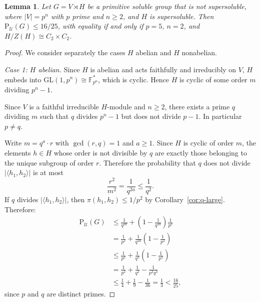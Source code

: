\documentclass{amsart}
\newtheorem{lemma}{Lemma}
\newcommand{\Psu}{\mathrm{P}_{\mathcal{U}}}
\begin{document}
	\begin{lemma}\label{lem:primitive}
		Let $G = V \rtimes H$ be a primitive soluble group that is 
		not supersoluble, where $|V| = p^n$ with $p$ prime and 
		$n \geq 2$, and $H$ is supersoluble. Then 
		$\Psu(G) \leq 16/25$, with equality if and only if $p = 5$, 
		$n=2$, and $H/Z(H) \cong C_2 \times C_2$.
	\end{lemma}
	\begin{proof}
		We consider separately the cases $H$ abelian and $H$ nonabelian.
		
		\medskip
		
		\noindent\textit{Case 1: $H$ abelian.}
		Since $H$ is abelian and acts faithfully and irreducibly on $V$, 
		$H$ embeds into $\mathrm{GL}(1,p^n) \cong \mathbb{F}_{p^n}^*$, 
		which is cyclic. Hence $H$ is cyclic of some order $m$ dividing 
		$p^n - 1$.
		
		Since $V$ is a faithful irreducible $H$-module and $n \geq 2$, 
		there exists a prime $q$ dividing $m$ such that $q$ divides 
		$p^n-1$ but does not divide $p-1$. In particular $p \neq q$.
		
		Write $m = q^a \cdot r$ with $\gcd(r,q) = 1$ and $a \geq 1$. 
		Since $H$ is cyclic of order $m$, the elements $h \in H$ whose 
		order is not divisible by $q$ are exactly those belonging to 
		the unique subgroup of order $r$. Therefore the probability 
		that $q$ does not divide $|\langle h_1,h_2\rangle|$ is at most
		$$\frac{r^2}{m^2} = \frac{1}{q^{2a}} \leq \frac{1}{q^2}.$$
		If $q$ divides $|\langle h_1,h_2\rangle|$, then %
		$\pi(h_1,h_2) \leq 1/p^2$ by Corollary~\ref{cor:q-large}. 
		Therefore:
		\begin{align*}
			\Psu(G) &\leq \frac{1}{q^{2a}} + 
			\left(1-\frac{1}{q^{2a}}\right)\frac{1}{p^2}\\
			&= \frac{1}{p^2} + \frac{1}{q^{2a}}\left(1-\frac{1}{p^2}\right)\\
			&\leq \frac{1}{p^2}+\frac{1}{q^2}\left(1-\frac{1}{p^2}\right)\\
			&= \frac{1}{p^2}+\frac{1}{q^2}-\frac{1}{p^2q^2}\\
			&\leq \frac{1}{4}+\frac{1}{9}-\frac{1}{36}
			= \frac{1}{3} < \frac{16}{25},
		\end{align*}
		since $p$ and $q$ are distinct primes.
		
		
	

\end{proof}
\end{document}
